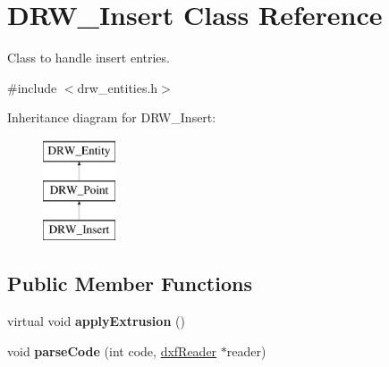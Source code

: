 \hypertarget{classDRW__Insert}{\section{D\-R\-W\-\_\-\-Insert Class Reference}
\label{classDRW__Insert}
}


Class to handle insert entries.  




{\ttfamily \#include $<$drw\-\_\-entities.\-h$>$}

Inheritance diagram for D\-R\-W\-\_\-\-Insert\-:\begin{figure}[H]
\begin{center}
\leavevmode
\includegraphics[height=3.000000cm]{classDRW__Insert}
\end{center}
\end{figure}
\subsection*{Public Member Functions}
\begin{DoxyCompactItemize}
\item 
\hypertarget{classDRW__Insert_a5bf643d5959c60e0a5f3b1f42925d0dd}{virtual void {\bfseries apply\-Extrusion} ()}\label{classDRW__Insert_a5bf643d5959c60e0a5f3b1f42925d0dd}

\item 
\hypertarget{classDRW__Insert_ab4eef6efc81bf777edf4b08d1f16ee79}{void {\bfseries parse\-Code} (int code, \hyperlink{classdxfReader}{dxf\-Reader} $\ast$reader)}\label{classDRW__Insert_ab4eef6efc81bf777edf4b08d1f16ee79}

\end{DoxyCompactItemize}
